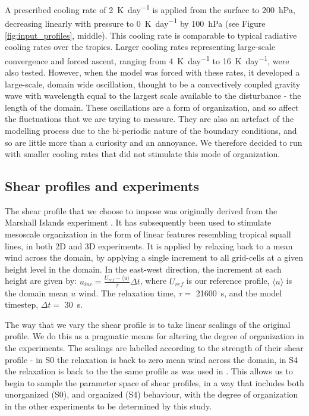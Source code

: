 \documentclass[11pt,a4paper]{article}
\newcommand\todo[1]{\textbf{TODO: #1}}
\begin{document}
A prescribed cooling rate of \SI{2}{K.day^{-1}} is applied from the surface to \SI{200}{hPa}, decreasing linearly with pressure to \SI{0}{K.day^{-1}} by \SI{100}{hPa} (see Figure \ref{fig:input_profiles}, middle). This cooling rate is comparable to typical radiative cooling rates over the tropics. Larger cooling rates representing large-scale convergence and forced ascent, ranging from \SI{4}{K.day^{-1}} to \SI{16}{K.day^{-1}}, were also tested. However, when the model was forced with these rates, it developed a large-scale, domain wide oscillation, thought to be a convectively coupled gravity wave with wavelength equal to the largest scale available to the disturbance - the length of the domain. These oscillations are a form of organization, and so affect the fluctuations that we are trying to measure. They are also an artefact of the modelling process due to the bi-periodic nature of the boundary conditions, and so are little more than a curiosity and an annoyance. We therefore decided to run with smaller cooling rates that did not stimulate this mode of organization.


\subsection{Shear profiles and experiments}

The shear profile that we choose to impose was originally derived from the Marshall Islands experiment \parencite{yanai1973determination}. It has subsequently been used to stimulate mesoscale organization in the form of linear features resembling tropical squall lines, in both 2D \parencite{tompkins2000impact} and 3D \parencite{grabowski1996long, CC2006II} experiments. It is applied by relaxing back to a mean wind across the domain, by applying a single increment to all grid-cells at a given height level in the domain. In the east-west direction, the increment at each height are given by: $u_{inc} = \frac{U_{ref} - \langle u \rangle}{\tau} \Delta t$, where $U_{ref}$ is our reference profile, $\langle u \rangle$ is the domain mean $u$ wind. The relaxation time, $\tau = $ \SI{21600}{s}, and the model timestep, $\Delta t = $ \SI{30}{s}. 

The way that we vary the shear profile is to take linear scalings of the original profile. We do this as a pragmatic means for altering the degree of organization in the experiments. The scalings are labelled according to the strength of their shear profile - in S0 the relaxation is back to zero mean wind across the domain, in S4 the relaxation is back to the the same profile as was used in \cite{CC2006II, tompkins2000impact}. This allows us to begin to sample the parameter space of shear profiles, in a way that includes both unorganized (S0), and organized (S4) behaviour, with the degree of organization in the other experiments to be determined by this study.
\end{document}
